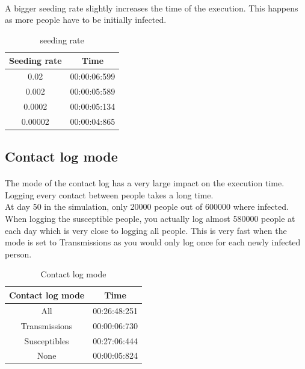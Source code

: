 \documentclass[runningheads]{llncs}
\begin{document}
\paragraph{} A bigger seeding rate slightly increases the time of the execution. This happens as more people have to be initially infected.
\begin{table}[!h]
	\centering
	\begin{tabular}{|c|c|}
		\hline
		Seeding rate & Time \\\hline
    	0.02 	& 00:00:06:599 \\\hline
    	0.002 	& 00:00:05:589 \\\hline
    	0.0002 	& 00:00:05:134 \\\hline
  		0.00002 & 00:00:04:865 \\
    	\hline
	\end{tabular}
	\caption{seeding rate}
\end{table}

\subsection{Contact log mode}

\paragraph{} The mode of the contact log has a very large impact on the execution time. Logging every contact between people takes a long time.\\
At day 50 in the simulation, only 20000 people out of 600000 where infected. When logging the susceptible people, you actually log almost 580000 people at each day which is very close to logging all people. This is very fast when the mode is set to Transmissions as you would only log once for each newly infected person.\\

\begin{table}[!h]
	\centering
	\begin{tabular}{|c|c|}
		\hline
		Contact log mode & Time \\\hline
   		All 			& 00:26:48:251 \\\hline
   		Transmissions 	& 00:00:06:730 \\\hline
   		Susceptibles 	& 00:27:06:444 \\\hline
   		None 			& 00:00:05:824 \\
    	\hline
	\end{tabular}
	\caption{Contact log mode}
\end{table}
\end{document}
